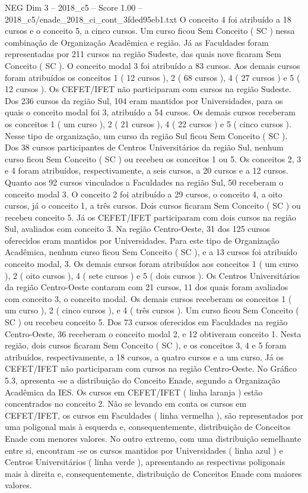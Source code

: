 \begin{textsample}{NEG Dim 3 – 2018\_c5 – Score 1.00 – 2018\_c5/enade\_2018\_ci\_cont\_3fded95eb1.txt}
O conceito 4 foi atribuído a 18 cursos e o conceito 5, a cinco cursos.
Um curso ficou Sem Conceito ( SC ) nessa combinação de Organização Acadêmica e região.
Já as Faculdades foram representadas por 211 cursos na região Sudeste, das quais nove ficaram Sem Conceito ( SC ).
O conceito modal 3 foi atribuído a 83 cursos.
Aos demais cursos foram atribuídos os conceitos 1 ( 12 cursos ), 2 ( 68 cursos ), 4 ( 27 cursos ) e 5 ( 12 cursos ).
Os CEFET/IFET não participaram com cursos na região Sudeste.
Dos 236 cursos da região Sul, 104 eram mantidos por Universidades, para os quais o conceito modal foi 3, atribuído a 54 cursos.
Os demais cursos receberam os conceitos 1 ( um curso ), 2 ( 21 cursos ), 4 ( 22 cursos ) e 5 ( cinco cursos ).
Nesse tipo de organização, um curso da região Sul ficou Sem Conceito ( SC ).
Dos 38 cursos participantes de Centros Universitários da região Sul, nenhum curso ficou Sem Conceito ( SC ) ou recebeu os conceitos 1 ou 5.
Os conceitos 2, 3 e 4 foram atribuídos, respectivamente, a seis cursos, a 20 cursos e a 12 cursos.
Quanto aos 92 cursos vinculados a Faculdades na região Sul, 50 receberam o conceito modal 3.
O conceito 2 foi atribuído a 29 cursos, o conceito 4, a oito cursos, já o conceito 1, a três cursos.
Dois cursos ficaram Sem Conceito ( SC ) ou recebeu conceito 5.
Já os CEFET/IFET participaram com dois cursos na região Sul, avaliados com conceito 3.
Na região Centro-Oeste, 31 dos 125 cursos oferecidos eram mantidos por Universidades.
Para este tipo de Organização Acadêmica, nenhum curso ficou Sem Conceito ( SC ), e a 13 cursos foi atribuído conceito modal, 3.
Os demais cursos foram atribuídos aos conceitos 1 ( um curso ), 2 ( oito cursos ), 4 ( sete cursos ) e 5 ( dois cursos ).
Os Centros Universitários da região Centro-Oeste contaram com 21 cursos, 11 dos quais foram avaliados com conceito 3, o conceito modal.
Os demais cursos receberam os conceitos 1 ( um curso ), 2 ( cinco cursos ), e 4 ( três cursos ).
Um curso ficou Sem Conceito ( SC ) ou recebeu conceito 5.
Dos 73 cursos oferecidos em Faculdades na região Centro-Oeste, 36 receberam o conceito modal 2, e 12 obtiveram conceito 1.
Nesta região, dois cursos ficaram Sem Conceito ( SC ), e os conceitos 3, 4 e 5 foram atribuídos, respectivamente, a 18 cursos, a quatro cursos e a um curso.
Já os CEFET/IFET não participaram com cursos na região Centro-Oeste.
No Gráfico 5.3, apresenta -se a distribuição do Conceito Enade, segundo a Organização Acadêmica da IES.
Os cursos em CEFET/IFET ( linha laranja ) estão concentrados no conceito 2.
Não se levando em conta os cursos em CEFET/IFET, os cursos em Faculdades ( linha vermelha ), são representados por uma poligonal mais à esquerda e, consequentemente, distribuição de Conceitos Enade com menores valores.
No outro extremo, com uma distribuição semelhante entre si, encontram -se os cursos mantidos por Universidades ( linha azul ) e Centros Universitários ( linha verde ), apresentando as respectivas poligonais mais à direita e, consequentemente, distribuição de Conceitos Enade com maiores valores.

\end{textsample}
